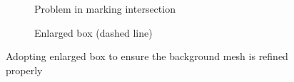 \begin{figure}
    \begin{subfigure}[b]{0.5\linewidth}
        \centering
        \caption{Problem in marking intersection}
        \label{qdt_fig:qdt_cutting_point_moving_problem}
    \end{subfigure}
    \begin{subfigure}[b]{0.5\linewidth}
        \centering
        \caption{Enlarged box (dashed line)}
        \label{qdt_fig:qdt_cutting_enlarged_box}
    \end{subfigure}
    \caption[Problem in marking intersection]{Adopting enlarged box to ensure the background mesh is refined properly}
    \label{qdt_fig:qdt_cutting_enlarged_box_point_moving_problem}
\end{figure}

